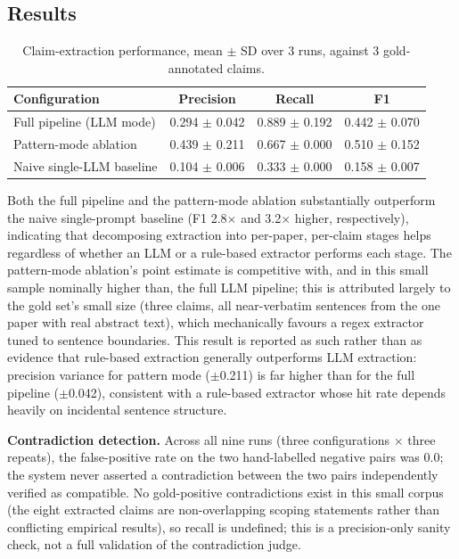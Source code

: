 \documentclass[11pt]{article}
\begin{document}
\subsection{Results}

\begin{table}[h]
\centering
\caption{Claim-extraction performance, mean $\pm$ SD over 3 runs, against 3 gold-annotated claims.}
\label{tab:claims}
\begin{tabular}{@{}lccc@{}}
\toprule
Configuration & Precision & Recall & F1 \\
\midrule
Full pipeline (LLM mode) & 0.294 $\pm$ 0.042 & 0.889 $\pm$ 0.192 & 0.442 $\pm$ 0.070 \\
Pattern-mode ablation & 0.439 $\pm$ 0.211 & 0.667 $\pm$ 0.000 & 0.510 $\pm$ 0.152 \\
Naive single-LLM baseline & 0.104 $\pm$ 0.006 & 0.333 $\pm$ 0.000 & 0.158 $\pm$ 0.007 \\
\bottomrule
\end{tabular}
\end{table}

Both the full pipeline and the pattern-mode ablation substantially outperform the naive single-prompt baseline (F1 2.8$\times$ and 3.2$\times$ higher, respectively), indicating that decomposing extraction into per-paper, per-claim stages helps regardless of whether an LLM or a rule-based extractor performs each stage. The pattern-mode ablation's point estimate is competitive with, and in this small sample nominally higher than, the full LLM pipeline; this is attributed largely to the gold set's small size (three claims, all near-verbatim sentences from the one paper with real abstract text), which mechanically favours a regex extractor tuned to sentence boundaries. This result is reported as such rather than as evidence that rule-based extraction generally outperforms LLM extraction: precision variance for pattern mode ($\pm$0.211) is far higher than for the full pipeline ($\pm$0.042), consistent with a rule-based extractor whose hit rate depends heavily on incidental sentence structure.

\textbf{Contradiction detection.} Across all nine runs (three configurations $\times$ three repeats), the false-positive rate on the two hand-labelled negative pairs was 0.0; the system never asserted a contradiction between the two pairs independently verified as compatible. No gold-positive contradictions exist in this small corpus (the eight extracted claims are non-overlapping scoping statements rather than conflicting empirical results), so recall is undefined; this is a precision-only sanity check, not a full validation of the contradiction judge.
\end{document}
